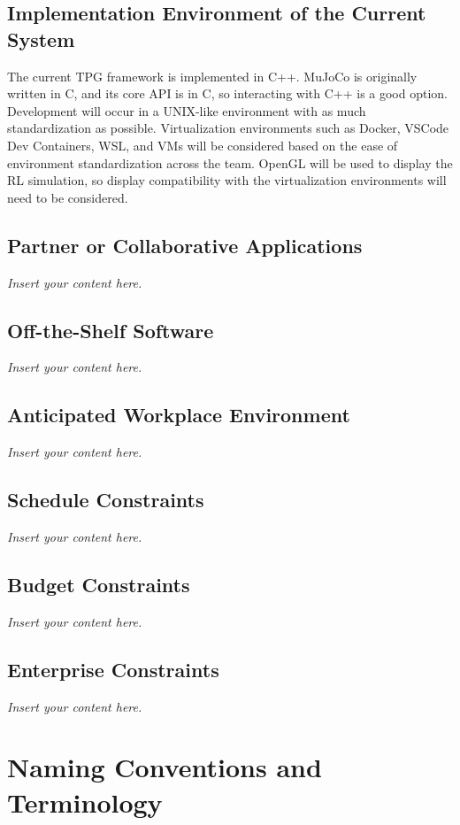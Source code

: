 \documentclass[12pt]{article}
\newcommand{\lips}{\textit{Insert your content here.}}
\begin{document}
\subsection{Implementation Environment of the Current System}
The current TPG framework is implemented in C++. MuJoCo is originally written in C, and its core API is in C, so interacting with C++ is a good option. Development will occur in a UNIX-like environment with as much standardization as possible. Virtualization environments such as Docker, VSCode Dev Containers, WSL, and VMs will be considered based on the ease of environment standardization across the team. OpenGL will be used to display the RL simulation, so display compatibility with the virtualization environments will need to be considered.

\subsection{Partner or Collaborative Applications}
\lips
\subsection{Off-the-Shelf Software}
\lips
\subsection{Anticipated Workplace Environment}
\lips
\subsection{Schedule Constraints}
\lips
\subsection{Budget Constraints}
\lips
\subsection{Enterprise Constraints}
\lips

\section{Naming Conventions and Terminology}
\end{document}
